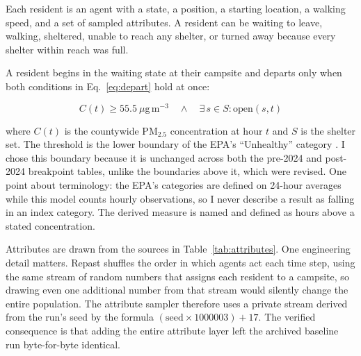 \documentclass[graybox]{svmult}
\begin{document}
Each resident is an agent with a state, a position, a starting location, a
walking speed, and a set of sampled attributes. A resident can be waiting to
leave, walking, sheltered, unable to reach any shelter, or turned away because
every shelter within reach was full.

A resident begins in the waiting state at their campsite and departs only when
both conditions in Eq.~\ref{eq:depart} hold at once:

\begin{equation}
\label{eq:depart}
C(t) \ge 55.5\ \mu\mathrm{g}\,\mathrm{m}^{-3}
\quad \wedge \quad
\exists\, s \in S : \mathrm{open}(s,t)
\end{equation}

where $C(t)$ is the countywide PM$_{2.5}$ concentration at hour $t$ and $S$ is
the shelter set. The threshold is the lower boundary of the EPA's ``Unhealthy''
category \cite{epaaqi2024}. I chose this boundary because it is unchanged across
both the pre-2024 and post-2024 breakpoint tables, unlike the boundaries above
it, which were revised. One point about terminology: the EPA's categories are
defined on 24-hour averages while this model counts hourly observations, so I
never describe a result as falling in an index category. The derived measure is
named and defined as hours above a stated concentration.

Attributes are drawn from the sources in Table~\ref{tab:attributes}. One
engineering detail matters. Repast shuffles the order in which agents act each
time step, using the same stream of random numbers that assigns each resident to
a campsite, so drawing even one additional number from that stream would silently
change the entire population. The attribute sampler therefore uses a private
stream derived from the run's seed by the formula
$(\mathrm{seed} \times 1000003) + 17$. The verified consequence is that adding
the entire attribute layer left the archived baseline run byte-for-byte
identical.
\end{document}
